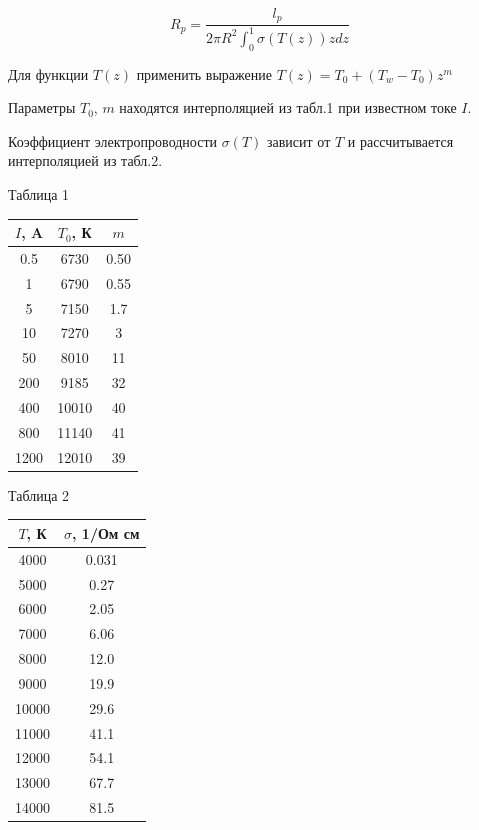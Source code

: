 \documentclass[a4paper,oneside,12pt]{extreport}
\begin{document}
\begin{equation*}
R_p = \frac{l_p}{2 \pi R^2 \int_0^1{\sigma(T(z))zdz}}
\end{equation*}


Для функции $T(z)$ применить выражение
$T(z) = T_0 + (T_w - T_0)z^m$

Параметры $T_0$, $m$ находятся интерполяцией из табл.1 
при известном токе $I$.

Коэффициент электропроводности
$\sigma(T)$ зависит от $T$
и рассчитывается интерполяцией из табл.2.
\begin{center}
Таблица 1
\end{center}
\begin{center}
    \begin{tabular}{ |c||c|c| }
        \hline
     $I$, A & $T_0$, К & $m$ \\ 
     \hline
     \hline
     0.5 & 6730 & 0.50 \\  
     \hline
     1 & 6790 & 0.55 \\  
     \hline
     5 & 7150 & 1.7 \\  
     \hline
     10 & 7270 & 3 \\  
     \hline
     50 & 8010 & 11 \\  
     \hline
     200 & 9185 & 32 \\  
     \hline
     400 & 10010 & 40 \\  
     \hline
     800 & 11140 & 41 \\  
     \hline
     1200 & 12010 & 39 \\  
     \hline
     \hline
    \end{tabular}
\end{center}

\begin{center}
    Таблица 2
\end{center}
\begin{center}
    \begin{tabular}{ |c||c| }
        \hline
        $T$, К & $\sigma$, 1/Ом см\\ 
        \hline
        \hline
        4000 & 0.031\\  
        \hline
        5000 & 0.27 \\  
        \hline
        6000 & 2.05 \\  
        \hline
        7000 & 6.06 \\  
        \hline
        8000 & 12.0 \\  
        \hline
        9000 & 19.9 \\  
        \hline
        10000 & 29.6 \\  
        \hline
        11000 & 41.1 \\  
        \hline
        12000 & 54.1 \\  
        \hline
        13000 & 67.7 \\  
        \hline
        14000 & 81.5 \\  
        \hline
        \hline
    \end{tabular}
\end{center}
\end{document}

